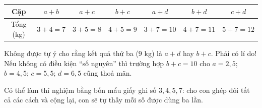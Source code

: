 {\begin{center}
\begin{tabular}{|c|c|c|c|c|c|c|}
\hline
\rowcolor{tmBlue!10} Cặp & $a+b$ & $a+c$ & $b+c$ & $a+d$ & $b+d$ & $c+d$\\ \hline
Tổng (kg) & $3+4=7$ & $3+5=8$ & $4+5=9$ & $3+7=10$ & $4+7=11$ & $5+7=12$\\ \hline
\end{tabular}
\end{center}
\begin{warnbox}Không được tự ý cho rằng kết quả thứ ba ($9$ kg) là $a+d$ hay $b+c$. Phải có lí do! Nếu không có điều kiện ``số nguyên'' thì trường hợp $b+c=10$ cho $a=2{,}5$; $b=4{,}5$; $c=5{,}5$; $d=6{,}5$ cũng thoả mãn.\end{warnbox}
\begin{parentbox}Có thể làm thí nghiệm bằng bốn mẩu giấy ghi số $3,4,5,7$: cho con ghép đôi tất cả các cách và cộng lại, con sẽ tự thấy mỗi số được dùng ba lần.\end{parentbox}
}
